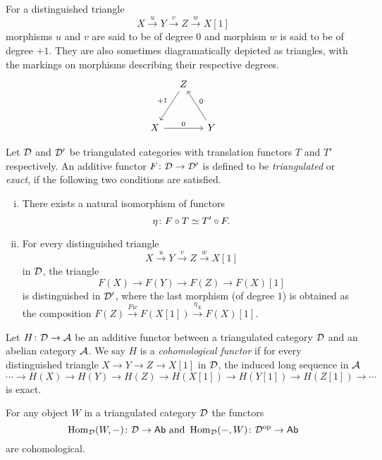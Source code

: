 \begin{remark}
    For a distinguished triangle
    \[
        X\xrightarrow{\ u \ } Y \xrightarrow{\ v \ } Z \xrightarrow{\ w \ } X[1]
    \]
    morphisms $u$ and $v$ are said to be of degree $0$ and morphism $w$ is said to be of degree $+1$. They are also sometimes diagramatically depicted as triangles, with the markings on morphisms describing their respective degrees.
    \[\begin{tikzcd}[column sep = small, row sep = 1.5em]
        & Z \\
        \\
        X && Y
        \arrow["{+1}"', from=1-2, to=3-1]
        \arrow["0", from=3-1, to=3-3]
        \arrow["0"', from=3-3, to=1-2]
    \end{tikzcd}\]
\end{remark}

\begin{definition}
    Let $\mathcal D$ and $\mathcal D'$ be triangulated categories with translation functors $T$ and $T'$ respectively. An additive functor $F \colon \mathcal D \to \mathcal D'$ is defined to be \emph{triangulated} or \emph{exact}, if the following two conditions are satisfied.
    \begin{enumerate}[(i)]
        \item There exists a natural isomorphism of functors 
        \[
            \eta \colon F \circ T \simeq T' \circ F.
        \]
        \item For every distinguished triangle
        \[
            X\xrightarrow{u} Y \xrightarrow{v} Z \xrightarrow{w} X[1]
        \]
        in $\mathcal D$, the triangle
        \[
            F(X) \to F(Y) \to F(Z) \to F(X)[1] 
        \]
        is distinguished in $\mathcal D'$, where the last morphism (of degree $1$) is obtained as the composition $F(Z) \xrightarrow{Fw} F(X[1]) \xrightarrow{\eta_X} F(X)[1]$.
    \end{enumerate}
\end{definition}

\begin{definition}
    Let $H\colon \mathcal D \to \mathcal A$ be an additive functor between a triangulated category $\mathcal D$ and an abelian category $\mathcal A$. We say $H$ is a \emph{cohomological functor} if for every distinguished triangle $X \to Y \to Z \to X[1]$ in $\mathcal D$, the induced long sequence in $\mathcal A$
    \[
        \cdots \to H(X) \to H(Y) \to H(Z) \to H(X[1]) \to H(Y[1]) \to H(Z[1]) \to \cdots
    \]
    is exact.
\end{definition}

\begin{example}
    For any object $W$ in a triangulated category $\mathcal D$ the functors 
    \[
    \operatorname{Hom}_\mathcal D(W, -) \colon \mathcal D \to \mathsf{Ab} \text{ and } \operatorname{Hom}_\mathcal D( - , W) \colon \mathcal D^{\text{op}} \to \mathsf{Ab}
    \]
    are cohomological.
\end{example}
